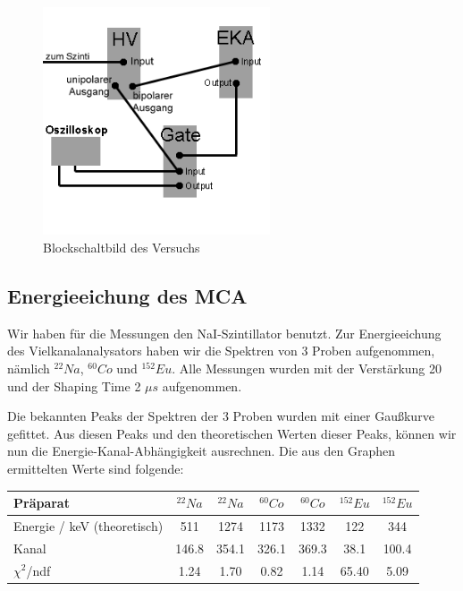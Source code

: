 \begin{figure}[H]
\centering \includegraphics[width = 0.6\textwidth]{Bilder/Schema.png}
\caption{Blockschaltbild des Versuchs}
\end{figure}

\subsection{Energieeichung des MCA}

Wir haben für die Messungen den NaI-Szintillator benutzt. Zur Energieeichung des Vielkanalanalysators haben wir die Spektren von 3 Proben aufgenommen, nämlich $^{22}Na$, $^{60}Co$ und $^{152}Eu$. Alle Messungen wurden mit der Verstärkung 20 und der Shaping Time 2 $\mu s$ aufgenommen.

Die bekannten Peaks der Spektren der 3 Proben wurden mit einer Gaußkurve gefittet. Aus diesen Peaks und den theoretischen Werten dieser Peaks, können wir nun die Energie-Kanal-Abhängigkeit ausrechnen. Die aus den Graphen ermittelten Werte sind folgende:\\

\begin{center}
\begin{tabular}{| l | c | c | c | c | c | c |} \hline
Präparat & $^{22}Na$ & $^{22}Na$ & $^{60}Co$ & $^{60}Co$ & $^{152}Eu$ & $^{152}Eu$\\ \hline
Energie / keV (theoretisch) & 511 & 1274 & 1173 & 1332 & 122 & 344\\ \hline
Kanal & 146.8 & 354.1 & 326.1 & 369.3 & 38.1 & 100.4\\ \hline
$\chi^2$/ndf & 1.24 & 1.70 & 0.82 & 1.14 & 65.40 & 5.09\\ \hline
\end{tabular}
\end{center}

